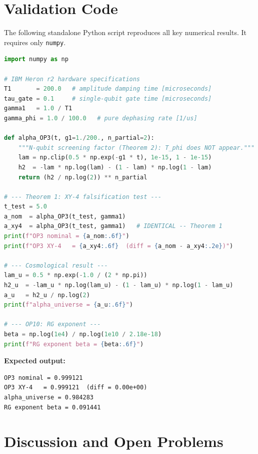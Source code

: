 \documentclass[12pt,letterpaper]{article}
\theoremstyle{definition}
\theoremstyle{remark}
\begin{document}
\section{Validation Code}
\label{sec:code}

The following standalone Python script reproduces all key numerical results.
It requires only \texttt{numpy}.

\begin{lstlisting}[language=Python, caption={Complete validation code: all key results
  derivable from hardware specifications alone.}, label={lst:validation}]
import numpy as np

# IBM Heron r2 hardware specifications
T1       = 200.0   # amplitude damping time [microseconds]
tau_gate = 0.1     # single-qubit gate time [microseconds]
gamma1   = 1.0 / T1
gamma_phi = 1.0 / 100.0   # pure dephasing rate [1/us]

def alpha_OP3(t, g1=1./200., n_partial=2):
    """N-qubit screening factor (Theorem 2): T_phi does NOT appear."""
    lam = np.clip(0.5 * np.exp(-g1 * t), 1e-15, 1 - 1e-15)
    h2  = -lam * np.log(lam) - (1 - lam) * np.log(1 - lam)
    return (h2 / np.log(2)) ** n_partial

# --- Theorem 1: XY-4 falsification test ---
t_test = 5.0
a_nom  = alpha_OP3(t_test, gamma1)
a_xy4  = alpha_OP3(t_test, gamma1)   # IDENTICAL -- Theorem 1
print(f"OP3 nominal = {a_nom:.6f}")
print(f"OP3 XY-4   = {a_xy4:.6f}  (diff = {a_nom - a_xy4:.2e})")

# --- Cosmological result ---
lam_u = 0.5 * np.exp(-1.0 / (2 * np.pi))
h2_u  = -lam_u * np.log(lam_u) - (1 - lam_u) * np.log(1 - lam_u)
a_u   = h2_u / np.log(2)
print(f"alpha_universe = {a_u:.6f}")

# --- OP10: RG exponent ---
beta = np.log(1e4) / np.log(1e10 / 2.18e-18)
print(f"RG exponent beta = {beta:.6f}")
\end{lstlisting}

\noindent\textbf{Expected output:}
\begin{verbatim}
OP3 nominal = 0.999121
OP3 XY-4   = 0.999121  (diff = 0.00e+00)
alpha_universe = 0.984283
RG exponent beta = 0.091441
\end{verbatim}

\section{Discussion and Open Problems}
\label{sec:discussion}
\end{document}

